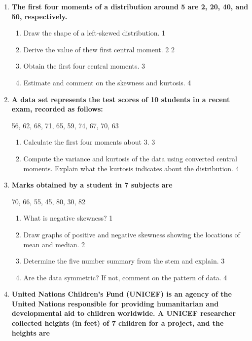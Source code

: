 \documentclass[a4paper,oneside]{book}
\begin{document}
\begin{enumerate}
  \item
	  \textbf{The first four moments of a distribution around 5 are 2, 20, 40, and 50, respectively.} 
  
  \begin{enumerate}
	\item 
	Draw the shape of a left-skewed distribution. \hfill 1
	\item 
	Derive the value of thew first central moment. \hfill 2 \hfill 2
    \item
    Obtain the first four central moments. \hfill 3
    \item
	Estimate and comment on the skewness and kurtosis. \hfill 4
  \end{enumerate}
  
  \item
\textbf{A data set represents the test scores of 10 students in a recent exam, recorded as follows:}

\begin{center}
56, 62, 68, 71, 65, 59, 74, 67, 70, 63
\end{center}

\begin{enumerate}
\item
Calculate the first four moments about 3. \hfill 3
\item
Compute the variance and kurtosis of the data using converted central moments. 
Explain what the kurtosis indicates about the distribution. \hfill 4
\end{enumerate}


 \item
	  \textbf{Marks obtained by a student in 7 subjects are} 
	  \begin{center}
	  70, 66, 55, 45, 80, 30, 82
	\end{center}
  
  \begin{enumerate}
    \item
	What is negative skewness? \hfill 1
    \item
	Draw graphs of positive and negative skewness showing the locations of mean and median. \hfill 2
    \item  
	Determine the five number summary from the stem and explain. \hfill 3
    \item
	Are the data symmetric? If not, comment on the pattern of data. \hfill 4
\end{enumerate}

 \item
	  \textbf{United Nations Children's Fund (UNICEF) is an agency of the United Nations responsible for providing humanitarian and developmental aid to children worldwide. A  UNICEF researcher collected heights (in feet) of 7 children for a project, and the heights are} 


\end{enumerate}
\end{document}
